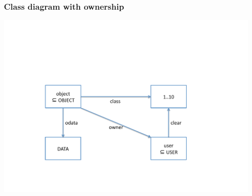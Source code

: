 \documentclass{beamer}
\begin{document}
\begin{frame} \frametitle{Class diagram with ownership}

  \begin{center}
    \includegraphics[scale=.5]{sdb3}
  \end{center}

\end{frame}
\end{document}
